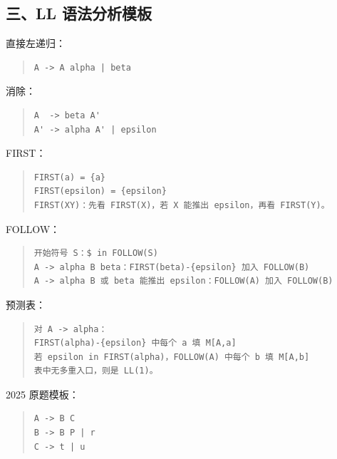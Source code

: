 \documentclass[UTF8,zihao=-4]{ctexart}
\begin{document}
\subsection{三、LL 语法分析模板}


直接左递归：


\begin{quote}
\footnotesize
\begin{verbatim}
A -> A alpha | beta
\end{verbatim}
\end{quote}


消除：


\begin{quote}
\footnotesize
\begin{verbatim}
A  -> beta A'
A' -> alpha A' | epsilon
\end{verbatim}
\end{quote}


FIRST：


\begin{quote}
\footnotesize
\begin{verbatim}
FIRST(a) = {a}
FIRST(epsilon) = {epsilon}
FIRST(XY)：先看 FIRST(X)，若 X 能推出 epsilon，再看 FIRST(Y)。
\end{verbatim}
\end{quote}


FOLLOW：


\begin{quote}
\footnotesize
\begin{verbatim}
开始符号 S：$ in FOLLOW(S)
A -> alpha B beta：FIRST(beta)-{epsilon} 加入 FOLLOW(B)
A -> alpha B 或 beta 能推出 epsilon：FOLLOW(A) 加入 FOLLOW(B)
\end{verbatim}
\end{quote}


预测表：


\begin{quote}
\footnotesize
\begin{verbatim}
对 A -> alpha：
FIRST(alpha)-{epsilon} 中每个 a 填 M[A,a]
若 epsilon in FIRST(alpha)，FOLLOW(A) 中每个 b 填 M[A,b]
表中无多重入口，则是 LL(1)。
\end{verbatim}
\end{quote}


2025 原题模板：


\begin{quote}
\footnotesize
\begin{verbatim}
A -> B C
B -> B P | r
C -> t | u
\end{verbatim}
\end{quote}
\end{document}
